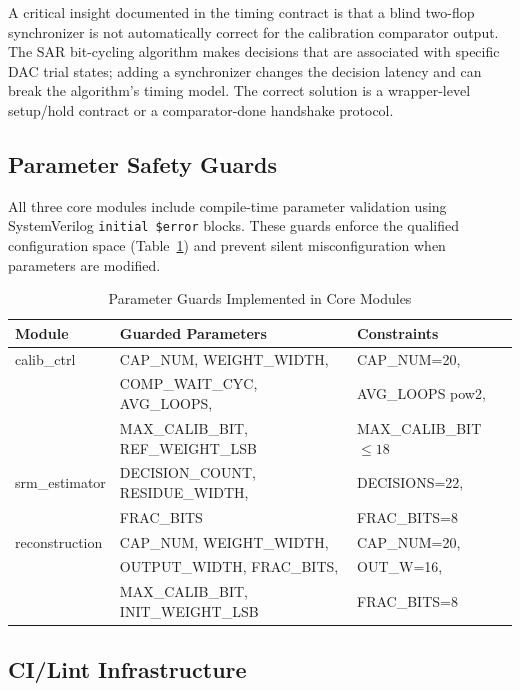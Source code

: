 \documentclass[journal]{IEEEtran}
\begin{document}
A critical insight documented in the timing contract is that a blind two-flop
synchronizer is not automatically correct for the calibration comparator
output. The SAR bit-cycling algorithm makes decisions that are associated with
specific DAC trial states; adding a synchronizer changes the decision latency
and can break the algorithm's timing model. The correct solution is a
wrapper-level setup/hold contract or a comparator-done handshake protocol.

\subsection{Parameter Safety Guards}

All three core modules include compile-time parameter validation using
SystemVerilog \texttt{initial \$error} blocks. These guards enforce the
qualified configuration space (Table~\ref{tab:guards}) and prevent silent
misconfiguration when parameters are modified.

\begin{table}[!t]
\centering
\caption{Parameter Guards Implemented in Core Modules}
\label{tab:guards}
\footnotesize
\setlength{\tabcolsep}{3pt}
\begin{tabular}{p{}p{}p{}}
\toprule
Module & Guarded Parameters & Constraints \\
\midrule
calib\_ctrl & CAP\_NUM, WEIGHT\_WIDTH, & CAP\_NUM=20, \\
 & COMP\_WAIT\_CYC, AVG\_LOOPS, & AVG\_LOOPS pow2, \\
 & MAX\_CALIB\_BIT, REF\_WEIGHT\_LSB & MAX\_CALIB\_BIT $\leq 18$ \\
\midrule
srm\_estimator & DECISION\_COUNT, RESIDUE\_WIDTH, & DECISIONS=22, \\
 & FRAC\_BITS & FRAC\_BITS=8 \\
\midrule
reconstruction & CAP\_NUM, WEIGHT\_WIDTH, & CAP\_NUM=20, \\
 & OUTPUT\_WIDTH, FRAC\_BITS, & OUT\_W=16, \\
 & MAX\_CALIB\_BIT, INIT\_WEIGHT\_LSB & FRAC\_BITS=8 \\
\bottomrule
\end{tabular}
\end{table}

\subsection{CI/Lint Infrastructure}
\end{document}
